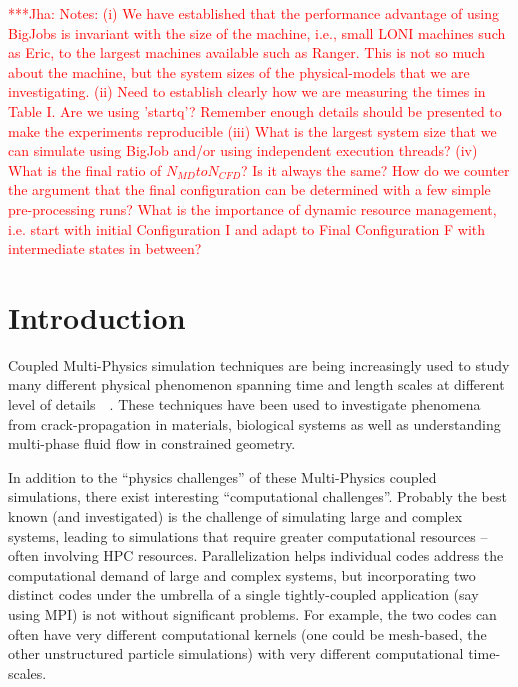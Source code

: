 \documentclass[conference,final]{IEEEtran}
\newcommand{\jhanote}[1]{ {\textcolor{red} { ***Jha: #1 }}}
\newcommand{\jhanote}[1]{}
\begin{document}
\jhanote{Notes: (i) We have established that the performance advantage
  of using BigJobs is invariant with the size of the machine, i.e.,
  small LONI machines such as Eric, to the largest machines available
  such as Ranger. This is not so much about the machine, but the
  system sizes of the physical-models that we are investigating. (ii)
  Need to establish clearly how we are measuring the times in Table
  I. Are we using 'startq'? Remember enough details should be
  presented to make the experiments reproducible (iii) What is the
  largest system size that we can simulate using BigJob and/or using
  independent execution threads? (iv) What is the final ratio of
  $N_{MD} to N_{CFD}$? Is it always the same? How do we counter the
  argument that the final configuration can be determined with a few
  simple pre-processing runs? What is the importance of dynamic
  resource management, i.e. start with initial Configuration I and
  adapt to Final Configuration F with intermediate states in between?
}


\section{Introduction}

Coupled Multi-Physics simulation techniques are being increasingly
used to study many different physical phenomenon spanning time and
length scales at different level of
details~\cite{Tai}~\cite{Watanabe}. These techniques have been used to
investigate phenomena from crack-propagation in materials, biological
systems as well as understanding multi-phase fluid flow in constrained
geometry.

In addition to the ``physics challenges'' of these Multi-Physics
coupled simulations, there exist interesting ``computational
challenges''. Probably the best known (and investigated) is the
challenge of simulating large and complex systems, leading to
simulations that require greater computational resources -- often
involving HPC resources. %
Parallelization helps individual codes address the computational
demand of large and complex systems, but incorporating two distinct
codes under the umbrella of a single tightly-coupled application (say
using MPI) is not without significant problems. For example, the two
codes can often have very different computational kernels (one could
be mesh-based, the other unstructured particle simulations) with very
different computational time-scales.
\end{document}
